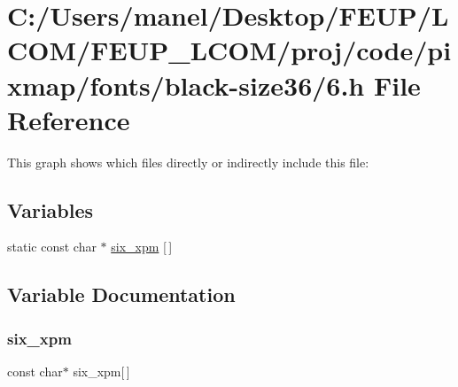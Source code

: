 \hypertarget{black-size36_26_8h}{}\section{C\+:/\+Users/manel/\+Desktop/\+F\+E\+U\+P/\+L\+C\+O\+M/\+F\+E\+U\+P\+\_\+\+L\+C\+O\+M/proj/code/pixmap/fonts/black-\/size36/6.h File Reference}
\label{black-size36_26_8h}
This graph shows which files directly or indirectly include this file\+:
\subsection*{Variables}
\begin{DoxyCompactItemize}
\item 
static const char $\ast$ \mbox{\hyperlink{black-size36_26_8h_a259dbfe741cdbb89320273c25d67172e}{six\+\_\+xpm}} \mbox{[}$\,$\mbox{]}
\end{DoxyCompactItemize}


\subsection{Variable Documentation}
\mbox{\label{black-size36_26_8h_a259dbfe741cdbb89320273c25d67172e}} 
\subsubsection{\texorpdfstring{six\_xpm}{six\_xpm}}
{\footnotesize\ttfamily const char$\ast$ six\+\_\+xpm\mbox{[}$\,$\mbox{]}\hspace{0.3cm}{\ttfamily [static]}}

